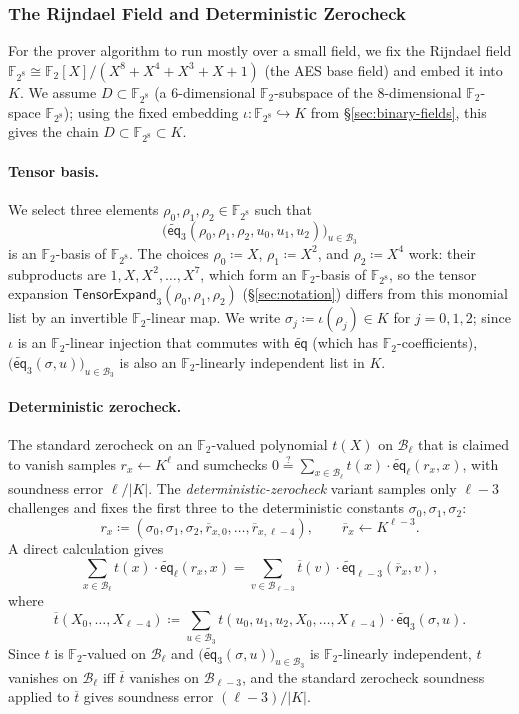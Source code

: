 \documentclass{article}
\theoremstyle{definition}
\newcommand*{\mle}{\widetilde}
\newcommand{\eq}{\mathsf{eq}}
\newcommand{\BB}{\mathcal{B}}
\newcommand{\FF}[1]{\mathbb{F}_{#1}}
\begin{document}
\subsubsection{The Rijndael Field and Deterministic Zerocheck}
\label{sec:rijndael}

For the prover algorithm to run mostly over a small field, we fix the Rijndael field $\FF{2^8} \cong \FF{2}[X] / (X^8 + X^4 + X^3 + X + 1)$ (the AES base field) and embed it into $K$. We assume $D \subset \FF{2^8}$ (a $6$-dimensional $\FF{2}$-subspace of the $8$-dimensional $\FF{2}$-space $\FF{2^8}$); using the fixed embedding $\iota \colon \FF{2^8} \hookrightarrow K$ from \S\ref{sec:binary-fields}, this gives the chain $D \subset \FF{2^8} \subset K$.

\paragraph{Tensor basis.}
We select three elements $\rho_0, \rho_1, \rho_2 \in \FF{2^8}$ such that
\[
  \bigl( \mle{\eq}_3(\rho_0, \rho_1, \rho_2, u_0, u_1, u_2) \bigr)_{u \in \BB_3}
\]
is an $\FF{2}$-basis of $\FF{2^8}$. The choices $\rho_0 \coloneqq X$, $\rho_1 \coloneqq X^2$, and $\rho_2 \coloneqq X^4$ work: their subproducts are $1, X, X^2, \ldots, X^7$, which form an $\FF{2}$-basis of $\FF{2^8}$, so the tensor expansion $\textsf{TensorExpand}_3(\rho_0, \rho_1, \rho_2)$ (\S\ref{sec:notation}) differs from this monomial list by an invertible $\FF{2}$-linear map. We write $\sigma_j \coloneqq \iota(\rho_j) \in K$ for $j = 0, 1, 2$; since $\iota$ is an $\FF{2}$-linear injection that commutes with $\mle{\eq}$ (which has $\FF{2}$-coefficients), $\bigl( \mle{\eq}_3(\sigma, u) \bigr)_{u \in \BB_3}$ is also an $\FF{2}$-linearly independent list in $K$.

\paragraph{Deterministic zerocheck.}
The standard zerocheck on an $\FF{2}$-valued polynomial $t(X)$ on $\BB_\ell$ that is claimed to vanish samples $r_x \gets K^\ell$ and sumchecks $0 \stackrel{?}{=} \sum_{x \in \BB_\ell} t(x) \cdot \mle{\eq}_\ell(r_x, x)$, with soundness error $\ell / |K|$. The \emph{deterministic-zerocheck} variant samples only $\ell - 3$ challenges and fixes the first three to the deterministic constants $\sigma_0, \sigma_1, \sigma_2$:
\[
  r_x \coloneqq (\sigma_0, \sigma_1, \sigma_2, \overline{r}_{x, 0}, \ldots, \overline{r}_{x, \ell - 4}), \qquad \overline{r}_x \gets K^{\ell - 3}.
\]
A direct calculation gives
\[
  \sum_{x \in \BB_\ell} t(x) \cdot \mle{\eq}_\ell(r_x, x) = \sum_{v \in \BB_{\ell - 3}} \overline{t}(v) \cdot \mle{\eq}_{\ell - 3}(\overline{r}_x, v),
\]
where
\[
  \overline{t}(X_0, \ldots, X_{\ell - 4}) \coloneqq \sum_{u \in \BB_3} t(u_0, u_1, u_2, X_0, \ldots, X_{\ell - 4}) \cdot \mle{\eq}_3(\sigma, u).
\]
Since $t$ is $\FF{2}$-valued on $\BB_\ell$ and $\bigl( \mle{\eq}_3(\sigma, u) \bigr)_{u \in \BB_3}$ is $\FF{2}$-linearly independent, $t$ vanishes on $\BB_\ell$ iff $\overline{t}$ vanishes on $\BB_{\ell - 3}$, and the standard zerocheck soundness applied to $\overline{t}$ gives soundness error $(\ell - 3) / |K|$.
\end{document}
